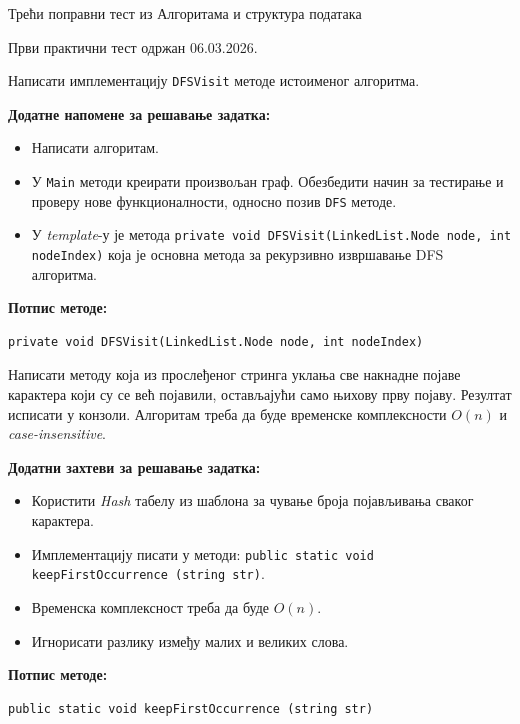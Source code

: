 
Трећи поправни тест из Алгоритама и структура података

Први практични тест одржан 06.03.2026.

Написати имплементацију \texttt{DFSVisit} методе истоименог алгоритма.

\textbf{Додатне напомене за решавање задатка:}
\begin{itemize}
	\item Написати алгоритам.
	\item У \texttt{Main} методи креирати произвољан граф. Обезбедити начин за тестирање и проверу нове функционалности, односно позив \texttt{DFS} методе.
	\item У \textit{template}-у је метода \texttt{private void DFSVisit(LinkedList.Node node, int nodeIndex)} која је основна метода за рекурзивно извршавање DFS алгоритма.
\end{itemize}

\textbf{Потпис методе:}
\begin{Verbatim}[fontsize=\small]
private void DFSVisit(LinkedList.Node node, int nodeIndex)
\end{Verbatim}

Написати методу која из прослеђеног стринга уклања све накнадне појаве карактера који су се већ појавили, остављајући само њихову прву појаву. Резултат исписати у конзоли. Алгоритам треба да буде временске комплексности $O(n)$ и \textit{case-insensitive}.

\textbf{Додатни захтеви за решавање задатка:}
\begin{itemize}
	\item Користити \textit{Hash} табелу из шаблона за чување броја појављивања сваког карактера.
	\item Имплементацију писати у методи: \texttt{public static void keepFirstOccurrence (string str)}.
	\item Временска комплексност треба да буде $O(n)$.
	\item Игнорисати разлику између малих и великих слова.
\end{itemize}

\textbf{Потпис методе:}
\begin{Verbatim}[fontsize=\small]
public static void keepFirstOccurrence (string str)
\end{Verbatim}


